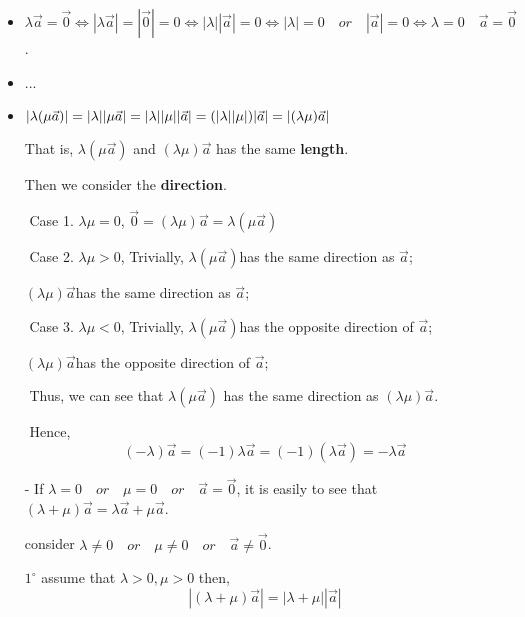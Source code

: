 \documentclass[UTF8]{ctexart}
\begin{document}
\begin{itemize}



 \item $\lambda \vec a  = \vec  0  \iff |\lambda \vec a | = |\vec 0 | =0 \iff |\lambda||\vec  a|=0 \iff |\lambda |=0 \quad or \quad |\vec a|=0\iff \lambda =0 \quad \vec  a = \vec 0 $.

 \item  ...

  \item $|\lambda (\mu \vec a )|= |\lambda ||\mu \vec  a |\\= |\lambda||\mu||\vec  a |\\= (|\lambda ||\mu|)|\vec a|\\= |(\lambda \mu)\vec a|$

        That is, $\lambda (\mu \vec  a )$ and $(\lambda \mu )\vec a$ has the same \textbf{length}.

        Then we consider the \textbf{direction}.

        ​	Case 1. $\lambda \mu=0$, $ \vec 0 =(\lambda \mu )\vec  a= \lambda (\mu \vec a )$

        ​	Case 2. $\lambda \mu >0$, Trivially, $\lambda (\mu \vec  a )$has the same direction as $\vec  a $;

        ​												$(\lambda \mu) \vec  a$has the same direction as $\vec  a$;											

        ​	Case 3. $\lambda \mu <0$, Trivially, $\lambda (\mu \vec  a )$has the opposite direction of $\vec  a $;

        ​												$(\lambda \mu) \vec  a$has the opposite direction of $\vec  a $;			

        ​	Thus, we can see that $\lambda (\mu \vec  a )$ has the same direction as $(\lambda \mu) \vec  a $.

        ​	Hence, 
        $$
        (- \lambda )\vec a  =  (-1)\lambda \vec a  = (-1)(\lambda \vec a)= -\lambda \vec a 
        $$

- If $\lambda =0 \quad or\quad  \mu =0 \quad or \quad \vec a =\vec 0 $, it is easily to see that $(\lambda + \mu )\vec  a = \lambda \vec a  + \mu \vec a$.

    consider $\lambda \neq 0 \quad or\quad  \mu \neq 0 \quad or \quad \vec a \neq \vec 0 $.

    ​	$1^{\circ}$  assume that $\lambda >0 , \mu >0 $ then,
    $$
      |(\lambda + \mu)\vec a |= |\lambda +\mu ||\vec a | 
      $$
      

\end{itemize}
\end{document}
